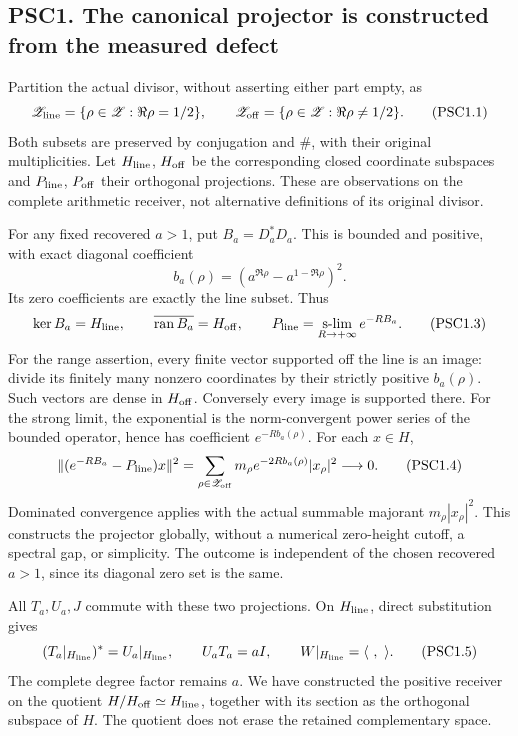 \subsection{PSC1. The canonical projector is constructed from the
measured
defect}\label{psc1.-the-canonical-projector-is-constructed-from-the-measured-defect}

Partition the actual divisor, without asserting either part empty, as \[
\mathscr Z_{\rm line}=\{\rho\in\mathscr Z:\Re\rho=1/2\},
\qquad\mathscr Z_{\rm off}=\{\rho\in\mathscr Z:\Re\rho\ne1/2\}.
\tag{PSC1.1}
\] Both subsets are preserved by conjugation and \(\#\), with their
original multiplicities. Let \(H_{\rm line}\), \(H_{\rm off}\) be the
corresponding closed coordinate subspaces and \(P_{\rm line}\),
\(P_{\rm off}\) their orthogonal projections. These are observations on
the complete arithmetic receiver, not alternative definitions of its
original divisor.

For any fixed recovered \(a>1\), put \(B_a=D_a^*D_a\). This is bounded
and positive, with exact diagonal coefficient \[
b_a(\rho)=(a^{\Re\rho}-a^{1-\Re\rho})^2.
\tag{PSC1.2}
\] Its zero coefficients are exactly the line subset. Thus \[
\ker B_a=H_{\rm line},\qquad
\overline{\operatorname{ran}B_a}=H_{\rm off},\qquad
P_{\rm line}=\operatorname*{s-lim}_{R\to+\infty}e^{-RB_a}.
\tag{PSC1.3}
\] For the range assertion, every finite vector supported off the line
is an image: divide its finitely many nonzero coordinates by their
strictly positive \(b_a(\rho)\). Such vectors are dense in
\(H_{\rm off}\). Conversely every image is supported there. For the
strong limit, the exponential is the norm-convergent power series of the
bounded operator, hence has coefficient \(e^{-Rb_a(\rho)}\). For each
\(x\in H\), \[
\|(e^{-RB_a}-P_{\rm line})x\|^2
=\sum_{\rho\in\mathscr Z_{\rm off}}m_\rho
e^{-2Rb_a(\rho)}|x_\rho|^2\longrightarrow0.
\tag{PSC1.4}
\] Dominated convergence applies with the actual summable majorant
\(m_\rho|x_\rho|^2\). This constructs the projector globally, without a
numerical zero-height cutoff, a spectral gap, or simplicity. The outcome
is independent of the chosen recovered \(a>1\), since its diagonal zero
set is the same.

All \(T_a,U_a,J\) commute with these two projections. On
\(H_{\rm line}\), direct substitution gives \[
(T_a|_{H_{\rm line}})^*=U_a|_{H_{\rm line}},\qquad
U_aT_a=aI,\qquad W|_{H_{\rm line}}=\langle\ ,\ \rangle.
\tag{PSC1.5}
\] The complete degree factor remains \(a\). We have constructed the
positive receiver on the quotient \(H/H_{\rm off}\simeq H_{\rm line}\),
together with its section as the orthogonal subspace of \(H\). The
quotient does not erase the retained complementary space.

